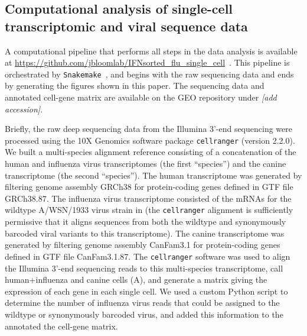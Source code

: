\documentclass[9pt,lineno]{elife}
\newcommand{\jdbcomment}[1]{\emph{\color{red} [#1]}}
\begin{document}
\subsection{Computational analysis of single-cell transcriptomic and viral sequence data}
A computational pipeline that performs all steps in the data analysis is available at \url{https://github.com/jbloomlab/IFNsorted_flu_single_cell}~\citep{russell2018github}. 
This pipeline is orchestrated by \texttt{Snakemake}~\citep{koster2012snakemake}, and begins with the raw sequencing data and ends by generating the figures shown in this paper.
The sequencing data and annotated cell-gene matrix are available on the GEO repository under \jdbcomment{add accession}.

Briefly, the raw deep sequencing data from the Illumina 3'-end sequencing were processed using the 10X Genomics software package \texttt{cellranger} (version 2.2.0). 
We built a multi-species alignment reference consisting of a concatenation of the human and influenza virus transcriptomes (the first ``species'') and the canine transcriptome (the second ``species''). 
The human transcriptome was generated by filtering genome assembly GRCh38 for protein-coding genes defined in GTF file GRCh38.87.
The influenza virus transcriptome consisted of the mRNAs for the wildtype A/WSN/1933 virus strain in  (the \texttt{cellranger} alignment is sufficiently permissive that it aligns sequences from both the wildtype and synonymously barcoded viral variants to this transcriptome).
The canine transcriptome was generated by filtering genome assembly CanFam3.1 for protein-coding genes defined in GTF file CanFam3.1.87.
The \texttt{cellranger} software was used to align the Illumina 3'-end sequencing reads to this multi-species transcriptome, call human+influenza and canine cells (A), and generate a matrix giving the expression of each gene in each single cell.
We used a custom Python script to determine the number of influenza virus reads that could be assigned to the wildtype or synonymously barcoded virus, and added this information to the annotated the cell-gene matrix.
\end{document}
